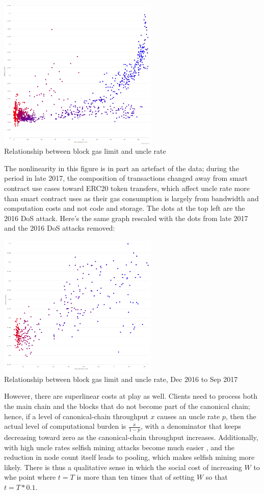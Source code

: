 \documentclass[12pt, final]{article}
\begin{document}
\begin{center}
\includegraphics[width=3in]{etherchain_correlation.png} \\
\footnotesize{Relationship between block gas limit and uncle rate}
\label{fig:three}
\end{center}

The nonlinearity in this figure is in part an artefact of the data; during the period in late 2017, the composition of transactions changed away from smart contract use cases toward ERC20 token transfers, which affect uncle rate more than smart contract uses as their gas consumption is largely from bandwidth and computation costs and not code and storage. The dots at the top left are the 2016 DoS attack. Here's the same graph rescaled with the dots from late 2017 and the 2016 DoS attacks removed:

\begin{center}
\includegraphics[width=3in]{etherchain_correlation_2.png} \\
\footnotesize{Relationship between block gas limit and uncle rate, Dec 2016 to Sep 2017}
\label{fig:three}
\end{center}

However, there are superlinear costs at play as well. Clients need to process both the main chain and the blocks that do not become part of the canonical chain; hence, if a level of canonical-chain throughput $x$ causes an uncle rate $p$, then the actual level of computational burden is $\frac{x}{1-p}$, with a denominator that keeps decreasing toward zero as the canonical-chain throughput increases. Additionally, with high uncle rates selfish mining attacks become much easier \cite{optimalsm}, and the reduction in node count itself leads to pooling, which makes selfish mining more likely. There is thus a qualitative sense in which the social cost of increasing $W$ to whe point where $t = T$ is more than ten times that of setting $W$ so that $t = T * 0.1$.
\end{document}
